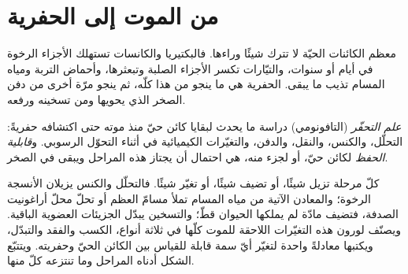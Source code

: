 \section{من الموت إلى الحفرية}\label{sec:b2:palaeoenvironments:taphonomy}

معظم الكائنات الحيّة لا تترك شيئًا وراءها. فالبكتيريا والكانسات تستهلك الأجزاء الرخوة في
أيام أو سنوات، والتيّارات تكسر الأجزاء الصلبة وتبعثرها، وأحماض التربة ومياه المسام
تذيب ما يبقى. الحفرية هي ما ينجو من هذا كلّه، ثم ينجو مرّة أخرى من دفن الصخر الذي
يحويها ومن تسخينه ورفعه.

\begin{definition}\label{def:b2:palaeoenvironments:taphonomy}
\emph{علم التحفّر} (التافونومي) دراسة ما يحدث لبقايا كائن حيّ
منذ موته حتى اكتشافه حفريةً: التحلّل، والكنس، والنقل، والدفن، والتغيّرات
الكيميائية في أثناء التحوّل الرسوبي. و\emph{قابلية الحفظ}
لكائن حيّ، أو لجزء منه، هي احتمال أن يجتاز هذه المراحل
ويبقى في الصخر.
\end{definition}

كلّ مرحلة تزيل شيئًا، أو تضيف شيئًا، أو تغيّر شيئًا. فالتحلّل والكنس يزيلان
الأنسجة الرخوة؛ والمعادن الآتية من مياه المسام تملأ مسامّ العظم أو تحلّ محلّ أراغونيت
الصدفة، فتضيف مادّة لم يملكها الحيوان قطّ؛ والتسخين يبدّل الجزيئات العضوية الباقية.
ويصنّف لورون هذه التغيّرات اللاحقة للموت كلّها في ثلاثة أنواع، الكسب والفقد والتبدّل،
ويكتبها معادلةً واحدة لتغيّر أيّ سمة قابلة للقياس بين الكائن الحيّ
وحفريته. ويتتبّع الشكل أدناه المراحل وما تنتزعه كلّ منها.

